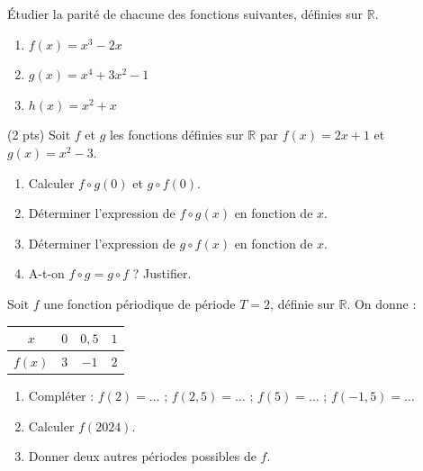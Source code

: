 \documentclass[11pt]{article}
\begin{document}
\begin{exercice}[Parité]
Étudier la parité de chacune des fonctions suivantes, définies sur $\mathbb{R}$.
\begin{enumerate}
\item $f(x)=x^3-2x$
\item $g(x)=x^4+3x^2-1$
\item $h(x)=x^2+x$
\end{enumerate}
\end{exercice}

\begin{exercice} \hfill (2 pts)
Soit $f$ et $g$ les fonctions définies sur $\mathbb{R}$ par $f(x)=2x+1$ et $g(x)=x^2-3$.
\begin{enumerate}
\item Calculer $f\circ g(0)$ et $g\circ f(0)$.
\item Déterminer l'expression de $f\circ g(x)$ en fonction de $x$.
\item Déterminer l'expression de $g\circ f(x)$ en fonction de $x$.
\item A-t-on $f\circ g = g\circ f$ ? Justifier.
\end{enumerate}
\end{exercice}

\begin{exercice}
Soit $f$ une fonction périodique de période $T=2$, définie sur $\mathbb{R}$. On donne :
\begin{center}
\begin{tabular}{|c|c|c|c|}
\hline
$x$ & $0$ & $0{,}5$ & $1$ \\
\hline
$f(x)$ & $3$ & $-1$ & $2$ \\
\hline
\end{tabular}
\end{center}
\begin{enumerate}
\item Compléter : $f(2)=\ldots$ ; $f(2{,}5)=\ldots$ ; $f(5)=\ldots$ ; $f(-1{,}5)=\ldots$
\item Calculer $f(2024)$.
\item Donner deux autres périodes possibles de $f$.
\end{enumerate}
\end{exercice}
\end{document}
